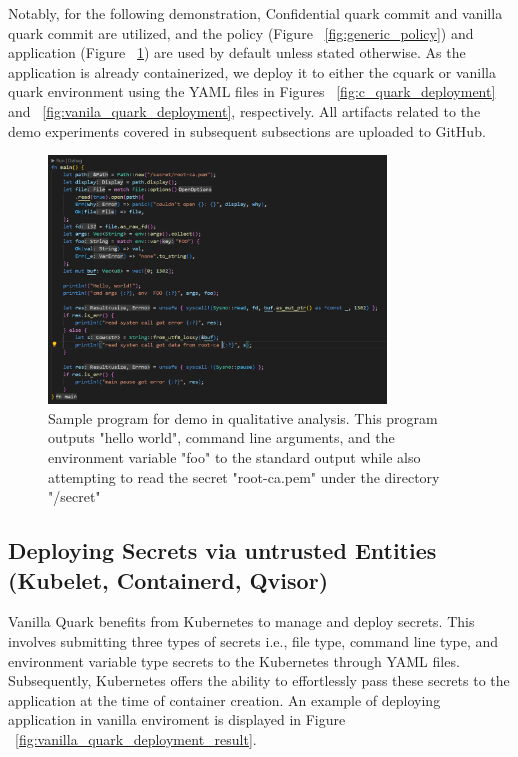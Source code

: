 Notably, for the following demonstration, Confidential quark commit \cite*{qualitativ_confidentail_quark} and vanilla quark commit \cite*{qualitativ_baseline} are utilized, and the policy\cite*{enclave_policy} (Figure ~\ref{fig:generic_policy}) and application\cite*{qualitativ_workload} (Figure ~\ref{fig:analysis_workload}) are used by default unless stated otherwise. As the application is already containerized, 
we deploy it to either the cquark or vanilla quark environment using the YAML files in Figures ~\ref{fig:c_quark_deployment} and ~\ref{fig:vanila_quark_deployment}, respectively.  All artifacts related to the demo experiments covered in subsequent subsections are uploaded to GitHub\cite*{Qaurk_Demo_for_qualitativ}.



\begin{figure}[H]
    \centering
    \includegraphics[width=0.8\textwidth]{images/analysis_workload.PNG}
    \caption[Sample program for demo in qualitative analysis]{Sample program for demo in qualitative analysis. This program outputs "hello world", command line arguments, and the environment variable "foo" to the standard output while also attempting to read the secret "root-ca.pem" under the directory "/secret"}
    \label{fig:analysis_workload}
\end{figure}



\subsection{Deploying Secrets via untrusted Entities (Kubelet, Containerd, Qvisor)}


Vanilla Quark benefits from Kubernetes\cite*{k8s} to manage and deploy secrets. This involves submitting three types of secrets i.e., file type, command line type, and environment variable type secrets to the Kubernetes through YAML files. Subsequently, Kubernetes offers the ability to effortlessly 
pass these secrets to the application at the time of container creation.  An example of deploying application in vanilla enviroment is displayed in Figure ~\ref{fig:vanilla_quark_deployment_result}.

